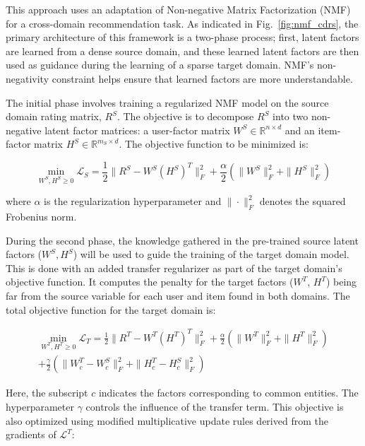 \documentclass[pdflatex,sn-mathphys-num]{sn-jnl}%
\theoremstyle{thmstyleone}%
\theoremstyle{thmstyletwo}%
\theoremstyle{thmstylethree}%
\begin{document}
This approach uses an adaptation of Non-negative Matrix Factorization (NMF) for a cross-domain recommendation task. As indicated in Fig.~\ref{fig:nmf_cdrs}, the primary architecture of this framework is a two-phase process; first, latent factors are learned from a dense source domain, and these learned latent factors are then used as guidance during the learning of a sparse target domain. NMF's non-negativity constraint helps ensure that learned factors are more understandable.

The initial phase involves training a regularized NMF model on the source domain rating matrix, $R^S$. The objective is to decompose $R^S$ into two non-negative latent factor matrices: a user-factor matrix $W^S \in \mathbb{R}^{n \times d}$ and an item-factor matrix $H^S \in \mathbb{R}^{m_S \times d}$. The objective function to be minimized is:

\begin{equation}
\min_{W^S, H^S \geq 0} \mathcal{L}_S = \frac{1}{2} \|R^S - W^S (H^S)^T\|_F^2 + \frac{\alpha}{2} (\|W^S\|_F^2 + \|H^S\|_F^2)
\end{equation}

where $\alpha$ is the regularization hyperparameter and $\|\cdot\|_F^2$ denotes the squared Frobenius norm.

During the second phase, the knowledge gathered in the pre-trained source latent factors ($W^S, H^S$) will be used to guide the training of the target domain model. This is done with an added transfer regularizer as part of the target domain's objective function. It computes the penalty for the target factors ($W^T$, $H^T$) being far from the source variable for each user and item found in both domains. The total objective function for the target domain is:

\begin{equation}
\begin{aligned}
\min_{W^T, H^T \geq 0} \mathcal{L}_T = \frac{1}{2} \|R^T - W^T (H^T)^T\|_F^2 + \frac{\alpha}{2} (\|W^T\|_F^2 + \|H^T\|_F^2) \\
+ \frac{\gamma}{2} (\|W_c^T - W_c^S\|_F^2 + \|H_c^T - H_c^S\|_F^2)
\end{aligned}
\end{equation}

Here, the subscript $c$ indicates the factors corresponding to common entities. The hyperparameter $\gamma$ controls the influence of the transfer term. This objective is also optimized using modified multiplicative update rules derived from the gradients of $\mathcal{L}^T$:
\end{document}

